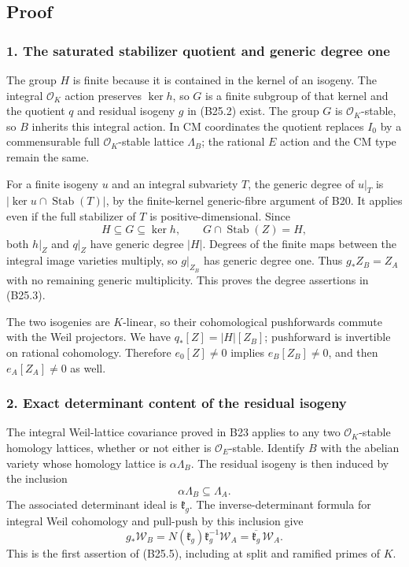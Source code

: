 \subsection{Proof}\label{proof}

\subsubsection{1. The saturated stabilizer quotient and generic degree one}\label{the-saturated-stabilizer-quotient-and-generic-degree-one}

The group \(H\) is finite because it is contained in the kernel of an isogeny. The integral \(\mathcal O_K\) action preserves \(\ker h\), so \(G\) is a finite subgroup of that kernel and the quotient \(q\) and residual isogeny \(g\) in (B25.2) exist. The group \(G\) is \(\mathcal O_K\)-stable, so \(B\) inherits this integral action. In CM coordinates the quotient replaces \(I_0\) by a commensurable full \(\mathcal O_K\)-stable lattice \(\Lambda_B\); the rational \(E\) action and the CM type remain the same.

For a finite isogeny \(u\) and an integral subvariety \(T\), the generic degree of \(u|_T\) is \(|\ker u\cap\operatorname{Stab}(T)|\), by the finite-kernel generic-fibre argument of B20. It applies even if the full stabilizer of \(T\) is positive-dimensional. Since \[
 H\subseteq G\subseteq\ker h,
 \qquad G\cap\operatorname{Stab}(Z)=H,
\] both \(h|_Z\) and \(q|_Z\) have generic degree \(|H|\). Degrees of the finite maps between the integral image varieties multiply, so \(g|_{Z_B}\) has generic degree one. Thus \(g_*Z_B=Z_A\) with no remaining generic multiplicity. This proves the degree assertions in (B25.3).

The two isogenies are \(K\)-linear, so their cohomological pushforwards commute with the Weil projectors. We have \(q_*[Z]=|H|[Z_B]\); pushforward is invertible on rational cohomology. Therefore \(e_0[Z]\ne0\) implies \(e_B[Z_B]\ne0\), and then \(e_A[Z_A]\ne0\) as well.

\subsubsection{2. Exact determinant content of the residual isogeny}\label{exact-determinant-content-of-the-residual-isogeny}

The integral Weil-lattice covariance proved in B23 applies to any two \(\mathcal O_K\)-stable homology lattices, whether or not either is \(\mathcal O_E\)-stable. Identify \(B\) with the abelian variety whose homology lattice is \(\alpha\Lambda_B\). The residual isogeny is then induced by the inclusion \[
 \alpha\Lambda_B\subseteq\Lambda_A.
\] The associated determinant ideal is \(\mathfrak k_g\). The inverse-determinant formula for integral Weil cohomology and pull-push by this inclusion give \[
 g_*\mathscr W_B
 =N(\mathfrak k_g)\mathfrak k_g^{-1}\mathscr W_A
 =\overline{\mathfrak k_g}\,\mathscr W_A.
\] This is the first assertion of (B25.5), including at split and ramified primes of \(K\).

